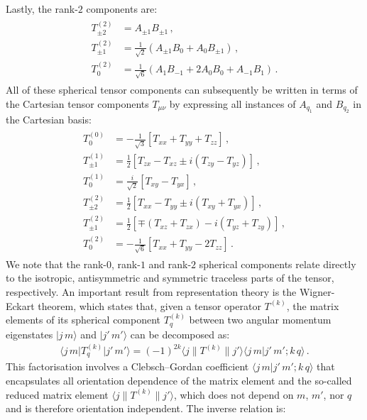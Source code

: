\documentclass[../Thesis-IJspeert.tex]{subfiles}
\begin{document}
Lastly, the rank-$2$ components are:
\begin{align}
\begin{split}
T_{\pm 2}^{(2)} &= A_{\pm 1}B_{\pm 1}\,,\\
T_{\pm 1}^{(2)} &= \frac{1}{\sqrt{2}}(A_{\pm 1}B_{0}+A_{0}B_{\pm 1})\,,\\
T_{0}^{(2)} &= \frac{1}{\sqrt{6}}(A_1B_{-1}+2A_0B_0+A_{-1}B_1)\,.
\end{split}
\end{align}
All of these spherical tensor components can subsequently be written in terms of the Cartesian tensor components $T_{\mu\nu}$ by expressing all instances of $A_{q_1}$ and $B_{q_2}$ in the Cartesian basis:
\begin{align}
\label{sphericalintermsofcartesian}
\begin{split}
T_0^{(0)}&=-\frac{1}{\sqrt{3}}\left[T_{xx}+T_{yy}+T_{zz}\right]\,,\\
T_{\pm 1}^{(1)} &=\frac{1}{2}\left[T_{zx}-T_{xz}\pm i(T_{zy}-T_{yz})\right]\,,\\
T_0^{(1)} &=\frac{i}{\sqrt{2}}\left[T_{xy}-T_{yx}\right]\,,\\
T_{\pm 2}^{(2)} &= \frac{1}{2}\left[T_{xx}-T_{yy}\pm i (T_{xy}+T_{yx})\right]\,,\\
T_{\pm 1}^{(2)} &= \frac{1}{2}\left[\mp (T_{xz}+T_{zx}) - i (T_{yz}+T_{zy})\right]\,,\\
T_{0}^{(2)} &= -\frac{1}{\sqrt{6}}\left[T_{xx}+T_{yy}-2T_{zz}\right]\,.
\end{split}
\end{align}
We note that the rank-$0$, rank-$1$ and rank-$2$ spherical components relate directly to the isotropic, antisymmetric and symmetric traceless parts of the tensor, respectively. An important result from representation theory is the Wigner-Eckart theorem, which states that, given a tensor operator $T^{(k)}$, the matrix elements of its spherical component $T^{(k)}_q$ between two angular momentum eigenstates $\vert j\, m\rangle$ and $\vert j'\, m'\rangle$ can be decomposed as:
\begin{align}
\label{wignereckart}
\langle j\, m \vert  T^{(k)}_q \vert j'\, m' \rangle = (-1)^{2k}\langle j \| T^{(k)} \| j' \rangle \langle j\, m \vert j'\, m'; k\, q \rangle\,.
\end{align}
This factorisation involves a Clebsch–Gordan coefficient $\langle j\, m \vert j'\, m'; k\, q \rangle$ that encapsulates all orientation dependence of the matrix element and the so-called reduced matrix element $\langle j \| T^{(k)} \| j' \rangle$, which does not depend on $m$, $m′$, nor $q$ and is therefore orientation independent. The inverse relation is:
\end{document}
